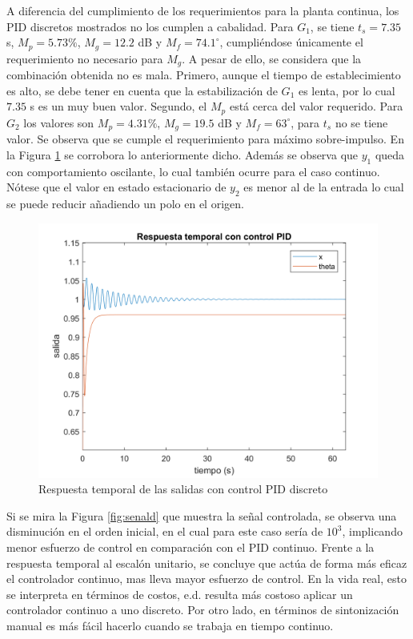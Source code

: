 \documentclass[journal]{IEEEtran}
\begin{document}
A diferencia del cumplimiento de los requerimientos para la planta continua, los PID discretos mostrados no los cumplen a cabalidad. Para $G_1$, se tiene $t_s=7.35$ s, $M_p=5.73\%$, $M_g=12.2$ dB y $M_f=74.1^{\circ}$, cumpliéndose únicamente el requerimiento no necesario para $M_g$. A pesar de ello, se considera que la combinación obtenida no es mala. Primero, aunque el tiempo de establecimiento es alto, se debe tener en cuenta que la estabilización de $G_1$ es lenta, por lo cual $7.35$ s es un muy buen valor. Segundo, el $M_p$ está cerca del valor requerido. Para $G_2$ los valores son $M_p=4.31\%$, $M_g=19.5$ dB y $M_f=63^{\circ}$, para $t_s$ no se tiene valor. Se observa que se cumple el requerimiento para máximo sobre-impulso. En la Figura \ref{fig:PIDDs} se corrobora lo anteriormente dicho. Además se observa que $y_1$ queda con comportamiento oscilante, lo cual también ocurre para el caso continuo. Nótese que el valor en estado estacionario de $y_2$ es menor al de la entrada lo cual se puede reducir añadiendo un polo en el origen.\\    

\begin{figure}[!h]
\caption{Respuesta temporal de las salidas con control PID discreto\label{fig:PIDDs}}
  \centering
\includegraphics[scale=0.18]{Bode/PIDD.png}
\end{figure}

Si se mira la Figura \ref{fig:senald} que muestra la señal controlada, se observa una disminución en el orden inicial, en el cual para este caso sería de $10^3$, implicando menor esfuerzo de control en comparación con el PID continuo. Frente a la respuesta temporal al escalón unitario, se concluye que actúa de forma más eficaz el controlador continuo, mas lleva mayor esfuerzo de control. En la vida real, esto se interpreta en términos de costos, e.d. resulta más costoso aplicar un controlador continuo a uno discreto. Por otro lado, en términos de sintonización manual es más fácil hacerlo cuando se trabaja en tiempo continuo. 
\end{document}
